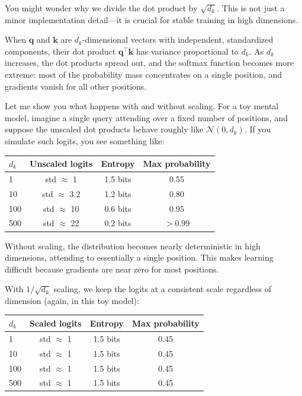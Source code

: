 You might wonder why we divide the dot product by $\sqrt{d_k}$. This is not just a minor implementation detail---it is crucial for stable training in high dimensions.

When $\mathbf{q}$ and $\mathbf{k}$ are $d_k$-dimensional vectors with independent, standardized components, their dot product $\mathbf{q}^\top \mathbf{k}$ has variance proportional to $d_k$. As $d_k$ increases, the dot products spread out, and the softmax function becomes more extreme: most of the probability mass concentrates on a single position, and gradients vanish for all other positions.

Let me show you what happens with and without scaling. For a toy mental model, imagine a single query attending over a fixed number of positions, and suppose the unscaled dot products behave roughly like $\mathcal{N}(0,d_k)$. If you simulate such logits, you see something like:

\begin{center}
\begin{tabular}{lccc}
\toprule
$d_k$ & \textbf{Unscaled logits} & \textbf{Entropy} & \textbf{Max probability} \\
\midrule
1 & std $\approx$ 1 & 1.5 bits & 0.55 \\
10 & std $\approx$ 3.2 & 1.2 bits & 0.80 \\
100 & std $\approx$ 10 & 0.6 bits & 0.95 \\
500 & std $\approx$ 22 & 0.2 bits & $>$0.99 \\
\bottomrule
\end{tabular}
\end{center}

Without scaling, the distribution becomes nearly deterministic in high dimensions, attending to essentially a single position. This makes learning difficult because gradients are near zero for most positions.

With $1/\sqrt{d_k}$ scaling, we keep the logits at a consistent scale regardless of dimension (again, in this toy model):

\begin{center}
\begin{tabular}{lccc}
\toprule
$d_k$ & \textbf{Scaled logits} & \textbf{Entropy} & \textbf{Max probability} \\
\midrule
1 & std $\approx$ 1 & 1.5 bits & 0.45 \\
10 & std $\approx$ 1 & 1.5 bits & 0.45 \\
100 & std $\approx$ 1 & 1.5 bits & 0.45 \\
500 & std $\approx$ 1 & 1.5 bits & 0.45 \\
\bottomrule
\end{tabular}
\end{center}

